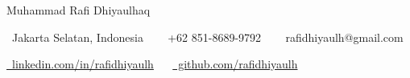 \begingroup
\centering

{\LARGE\color{ACCENT_COLOR} Muhammad Rafi Dhiyaulhaq}\par

{\fontsize{10pt}{12pt}\selectfont
  \raisebox{-0.1\height}\faHome\ Jakarta Selatan, Indonesia
  ~~
  \raisebox{-0.1\height}\faPhone\ +62 851-8689-9792
  ~~
  \raisebox{-0.1\height}\faEnvelope\ rafidhiyaulh@gmail.com
}\par

{\fontsize{10pt}{12pt}\selectfont
  \href{https://linkedin.com/in/rafidhiyaulh}{\raisebox{-0.1\height}\faLinkedin\ linkedin.com/in/rafidhiyaulh}
  ~~
  \href{https://github.com/rafidhiyaulh}{\raisebox{-0.1\height}\faGithub\ github.com/rafidhiyaulh}
}

\par
\vspace{-2pt}
\endgroup